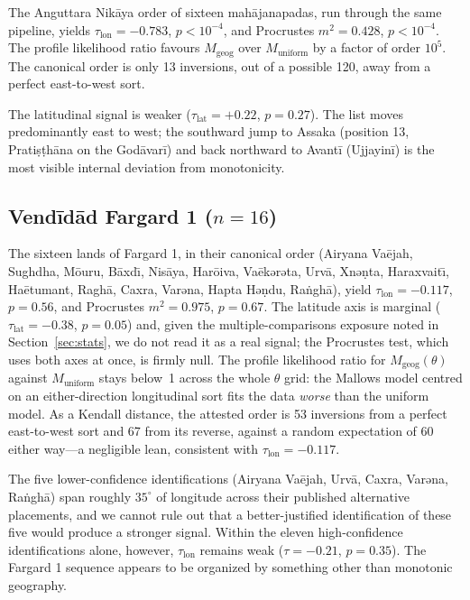 \documentclass[11pt]{article}
\begin{document}
The Anguttara Nikāya order of sixteen mahājanapadas, run through the
same pipeline, yields $\tau_\text{lon} = -0.783$, $p < 10^{-4}$, and
Procrustes $m^2 = 0.428$, $p < 10^{-4}$. The profile likelihood
ratio favours $M_\text{geog}$ over $M_\text{uniform}$ by a factor of
order $10^5$. The canonical order is only 13 inversions, out of a
possible 120, away from a perfect east-to-west sort.

The latitudinal signal is weaker ($\tau_\text{lat} = +0.22$,
$p = 0.27$). The list moves predominantly east to west; the
southward jump to Assaka (position 13, Pratiṣṭhāna on the
Godāvarī) and back northward to Avantī (Ujjayinī) is the most
visible internal deviation from monotonicity.

\subsection{Vendīdād Fargard 1 ($n=16$)}\label{sec:avesta}

The sixteen lands of Fargard 1, in their canonical order
(Airyana Vaējah, Sughdha, Mōuru, B\={a}xd\={\i}, Nisāya, Harōiva,
Vaēkərəta, Urvā, Xnəṇta, Haraxvait\={\i}, Haētumant, Ragh\={a},
Caxra, Varəna, Hapta Həṇdu, Ra\.{n}gh\={a}), yield $\tau_\text{lon} =
-0.117$, $p = 0.56$, and Procrustes $m^2 = 0.975$, $p = 0.67$.
The latitude axis is marginal ($\tau_\text{lat} = -0.38$,
$p = 0.05$) and, given the multiple-comparisons exposure noted in
Section~\ref{sec:stats}, we do not read it as a real signal; the
Procrustes test, which uses both axes at once, is firmly null.
The profile likelihood ratio for $M_\text{geog}(\theta)$ against
$M_\text{uniform}$ stays below~1 across the whole $\theta$ grid: the
Mallows model centred on an either-direction longitudinal sort fits
the data \emph{worse} than the uniform model. As a Kendall distance, the
attested order is 53 inversions from a perfect east-to-west sort and
67 from its reverse, against a random expectation of 60 either
way---a negligible lean, consistent with $\tau_\text{lon} = -0.117$.

The five lower-confidence identifications (Airyana Vaējah, Urvā,
Caxra, Varəna, Ra\.{n}gh\={a}) span roughly $35^\circ$ of longitude
across their published alternative placements, and we cannot rule
out that a better-justified identification of these five would
produce a stronger signal. Within the eleven
high-confidence identifications alone, however, $\tau_\text{lon}$
remains weak ($\tau = -0.21$, $p = 0.35$). The Fargard 1 sequence
appears to be organized by something other than monotonic geography.
\end{document}
